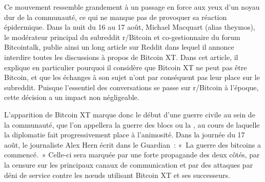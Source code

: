 Ce mouvement ressemble grandement à un passage en force aux yeux d'un noyau dur de la communauté, ce qui ne manque pas de provoquer sa réaction épidermique. Dans la nuit du 16 au 17 août, Michael Macquart (alias theymos), le modérateur principal du subreddit r/Bitcoin et co-gestionnaire du forum Bitcointalk, publie ainsi un long article sur Reddit dans lequel il annonce interdire toutes les discussions à propos de Bitcoin XT. Dans cet article, il explique en particulier pourquoi il considère que Bitcoin XT ne peut pas être Bitcoin, et que les échanges à son sujet n'ont par conséquent pas leur place sur le subreddit. Puisque l'essentiel des conversations se passe sur r/Bitcoin à l'époque, cette décision a un impact non négligeable.

L'apparition de Bitcoin XT marque donc le début d'une guerre civile au sein de la communauté, que l'on appellera la guerre des blocs ou la , au cours de laquelle la diplomatie fait progressivement place à l'animosité. Dans la journée du 17 août, le journaliste Alex Hern écrit dans le Guardian~: «~La guerre des bitcoins a commencé.~» Celle-ci sera marquée par une forte propagande des deux côtés, par la censure sur les principaux canaux de communication et par des attaques par déni de service contre les nœuds utilisant Bitcoin XT et ses successeurs.

